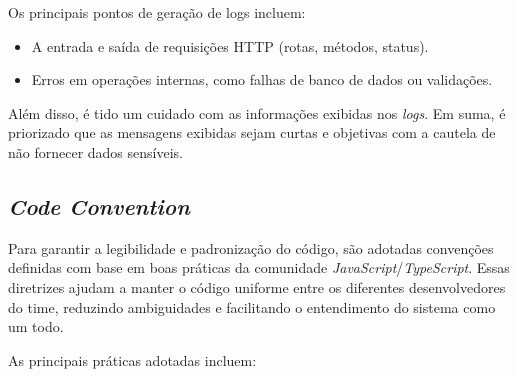 Os principais pontos de geração de logs incluem:
\begin{itemize}
	\item A entrada e saída de requisições HTTP (rotas, métodos, status).
	\item Erros em operações internas, como falhas de banco de dados ou validações.
\end{itemize}

Além disso, é tido um cuidado com as informações exibidas nos \textit{logs}. Em suma, é priorizado que as mensagens exibidas sejam curtas e objetivas com a cautela de não fornecer dados sensíveis.

\subsection{\textit{Code Convention}}
Para garantir a legibilidade e padronização do código, são adotadas convenções definidas com base em boas práticas da comunidade \textit{JavaScript}/\textit{TypeScript}.
Essas diretrizes ajudam a manter o código uniforme entre os diferentes desenvolvedores do time, reduzindo ambiguidades e facilitando o entendimento do sistema como um todo.

As principais práticas adotadas incluem:

